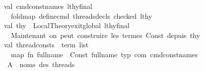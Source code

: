 \begin{isabellebody}
\ \ \ \ \ \ \ \ \ \ val\ {\isacharparenleft}{\kern0pt}cmd{\isacharunderscore}{\kern0pt}const{\isacharunderscore}{\kern0pt}names{\isacharcomma}{\kern0pt}\ lthy{\isacharunderscore}{\kern0pt}final{\isacharparenright}{\kern0pt}\ {\isacharequal}{\kern0pt}\isanewline
\ \ \ \ \ \ \ \ \ \ \ \ fold{\isacharunderscore}{\kern0pt}map\ define{\isacharunderscore}{\kern0pt}cmd\ {\isacharparenleft}{\kern0pt}{\isacharhash}{\kern0pt}threads{\isacharunderscore}{\kern0pt}decls\ checked{\isacharparenright}{\kern0pt}\ lthy{}\isanewline
\ \ \ \ \ \ \ \ \ \ \isanewline
\ \ \ \ \ \ \ \ \ \ val\ thy{\isacharprime}{\kern0pt}\ {\isacharequal}{\kern0pt}\ Local{\isacharunderscore}{\kern0pt}Theory{\isachardot}{\kern0pt}exit{\isacharunderscore}{\kern0pt}global\ lthy{\isacharunderscore}{\kern0pt}final\isanewline
\ \ \ \ \ \ \ \ \ \ \isanewline
\ \ \ \ \ \ \ \ \ \ {\isacharparenleft}{\kern0pt}{\isacharasterisk}{\kern0pt}\ {}{\isachardot}{\kern0pt}\ Maintenant\ on\ peut\ construire\ les\ termes\ Const{\isacharparenleft}{\kern0pt}{\isachardot}{\kern0pt}{\isachardot}{\kern0pt}{\isachardot}{\kern0pt}{\isacharparenright}{\kern0pt}\ depuis\ thy{\isacharprime}{\kern0pt}\ {\isacharasterisk}{\kern0pt}{\isacharparenright}{\kern0pt}\isanewline
\ \ \ \ \ \ \ \ \ \ val\ thread{\isacharunderscore}{\kern0pt}consts\ {\isacharcolon}{\kern0pt}\ term\ list\ {\isacharequal}{\kern0pt}\isanewline
\ \ \ \ \ \ \ \ \ \ \ \ map\ {\isacharparenleft}{\kern0pt}fn\ full{\isacharunderscore}{\kern0pt}name\ {\isacharequal}{\kern0pt}{\isachargreater}{\kern0pt}\ Const\ {\isacharparenleft}{\kern0pt}full{\isacharunderscore}{\kern0pt}name{\isacharcomma}{\kern0pt}\ {\isacharat}{\kern0pt}{\isacharbraceleft}{\kern0pt}typ\ com{\isacharbraceright}{\kern0pt}{\isacharparenright}{\kern0pt}{\isacharparenright}{\kern0pt}\ cmd{\isacharunderscore}{\kern0pt}const{\isacharunderscore}{\kern0pt}names\isanewline
\isanewline
\ \ \ \ \ \ \ \ \ \ {\isacharparenleft}{\kern0pt}{\isacharasterisk}{\kern0pt}\ A{\isachardot}{\kern0pt}\ \ noms\ des\ threads\ {\isacharminus}{\kern0pt}{\isacharminus}{\kern0pt}{\isacharminus}{\kern0pt}{\isacharminus}{\kern0pt}{\isacharminus}{\kern0pt}{\isacharminus}{\kern0pt}{\isacharminus}{\kern0pt}{\isacharminus}{\kern0pt}{\isacharminus}{\kern0pt}{\isacharminus}{\kern0pt}{\isacharminus}{\kern0pt}{\isacharminus}{\kern0pt}{\isacharminus}{\kern0pt}{\isacharminus}{\kern0pt}{\isacharminus}{\kern0pt}{\isacharminus}{\kern0pt}{\isacharminus}{\kern0pt}{\isacharminus}{\kern0pt}{\isacharminus}{\kern0pt}{\isacharminus}{\kern0pt}{\isacharminus}{\kern0pt}{\isacharminus}{\kern0pt}{\isacharminus}{\kern0pt}{\isacharminus}{\kern0pt}{\isacharminus}{\kern0pt}{\isacharminus}{\kern0pt}{\isacharminus}{\kern0pt}{\isacharminus}{\kern0pt}{\isacharminus}{\kern0pt}{\isacharminus}{\kern0pt}{\isacharminus}{\kern0pt}{\isacharminus}{\kern0pt}{\isacharminus}{\kern0pt}{\isacharminus}{\kern0pt}{\isacharminus}{\kern0pt}{\isacharminus}{\kern0pt}{\isacharminus}{\kern0pt}{\isacharminus}{\kern0pt}{\isacharminus}{\kern0pt}{\isacharminus}{\kern0pt}{\isacharminus}{\kern0pt}{\isacharminus}{\kern0pt}{\isacharminus}{\kern0pt}{\isacharminus}{\kern0pt}{\isacharminus}{\kern0pt}{\isacharminus}{\kern0pt}{\isacharminus}{\kern0pt}{\isacharminus}{\kern0pt}\ {\isacharasterisk}{\kern0pt}{\isacharparenright}{\kern0pt}\isanewline

\end{isabellebody}
